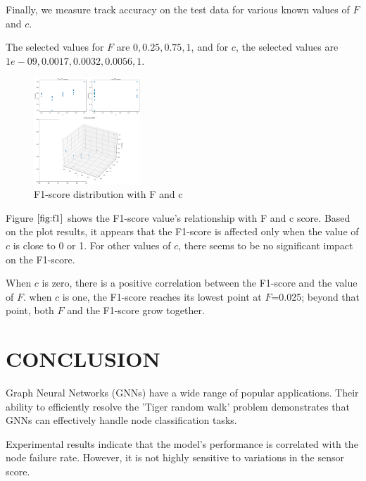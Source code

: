 \documentclass{article}
\begin{document}
  Finally, we measure track accuracy on the test data for various known values of $F$ and $c$.

  The selected values for $F$ are $0, 0.25, 0.75, 1$, and for $c$, the selected values are $1e-09, 0.0017, 0.0032, 0.0056, 1$.
  
  \begin{figure}[htb]

    \begin{minipage}[b]{1.0\linewidth}
      \centering
      \centerline{\includegraphics[width=4.0cm]{images/F_c_f1}}
    \end{minipage}
    \caption{F1-score distribution with F and c}
    \label{fig:f1}
    \end{figure}


Figure $\ref{fig:f1}$ shows the F1-score value's relationship with F and c score.
Based on the plot results, it appears that the F1-score is affected only when the value of $c$ is close to 0 or 1. For other values of $c$, there seems to be no significant impact on the F1-score.

When $c$ is zero, there is a positive correlation between the F1-score and the value of $F$.
when $c$ is one, the F1-score reaches its lowest point at 
$F$=0.025; beyond that point, both $F$ and the F1-score grow together.

\section{CONCLUSION}
\label{sec:conclusion}

Graph Neural Networks (GNNs) have a wide range of popular applications. Their ability to efficiently resolve the 'Tiger random walk' problem demonstrates that GNNs can effectively handle node classification tasks.

Experimental results indicate that the model's performance is correlated with the node failure rate. However, it is not highly sensitive to variations in the sensor score.
\end{document}
